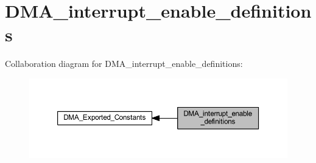 \hypertarget{group___d_m_a__interrupt__enable__definitions}{}\section{D\+M\+A\+\_\+interrupt\+\_\+enable\+\_\+definitions}
\label{group___d_m_a__interrupt__enable__definitions}
Collaboration diagram for D\+M\+A\+\_\+interrupt\+\_\+enable\+\_\+definitions\+:\nopagebreak
\begin{figure}[H]
\begin{center}
\leavevmode
\includegraphics[width=350pt]{group___d_m_a__interrupt__enable__definitions}
\end{center}
\end{figure}
